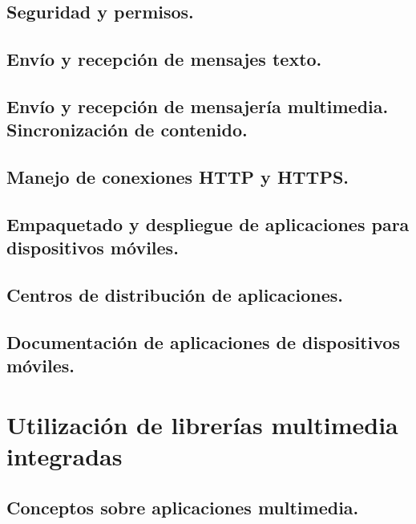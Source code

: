 \documentclass[a4paper,12pt,spanish]{sphinxmanual}
\begin{document}
\section{Seguridad y permisos.}
\label{tema2:seguridad-y-permisos}

\section{Envío y recepción de mensajes texto.}
\label{tema2:envio-y-recepcion-de-mensajes-texto}

\section{Envío y recepción de mensajería multimedia. Sincronización de contenido.}
\label{tema2:envio-y-recepcion-de-mensajeria-multimedia-sincronizacion-de-contenido}

\section{Manejo de conexiones HTTP y HTTPS.}
\label{tema2:manejo-de-conexiones-http-y-https}

\section{Empaquetado y despliegue de aplicaciones para dispositivos móviles.}
\label{tema2:empaquetado-y-despliegue-de-aplicaciones-para-dispositivos-moviles}

\section{Centros de distribución de aplicaciones.}
\label{tema2:centros-de-distribucion-de-aplicaciones}

\section{Documentación de aplicaciones de dispositivos móviles.}
\label{tema2:documentacion-de-aplicaciones-de-dispositivos-moviles}

\chapter{Utilización de librerías multimedia integradas}
\label{tema3:utilizacion-de-librerias-multimedia-integradas}\label{tema3::doc}

\section{Conceptos sobre aplicaciones multimedia.}
\label{tema3:conceptos-sobre-aplicaciones-multimedia}
\end{document}
